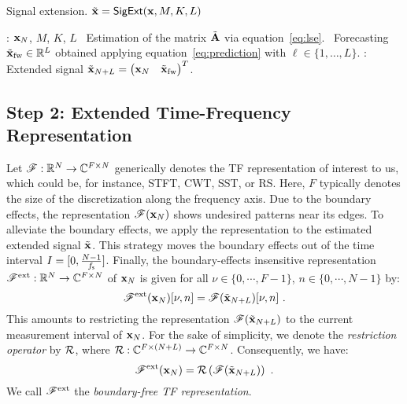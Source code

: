 \begin{algorithm}
\caption{Signal extension. $\tilde{{\mathbf x}} = \relax{\sf SigExt}({\mathbf x},M,K,L)$}
\label{alg:extension}
\begin{algorithmic}
: ${\mathbf x}_N$, $M$, $K$, $L$
\STATE \vspace{-2mm}
\STATE \quad\textbullet\ Estimation of the matrix $\tilde{{\mathbf A}}$ via equation~\eqref{eq:lse}.
\STATE \quad\textbullet\ Forecasting $\tilde{{\mathbf x}}_{\mathrm{fw}}\in{\mathbb R}^L$ obtained applying equation~\eqref{eq:prediction} with $\ell\in\{1,\ldots,L\}$.
\STATE \vspace{-2mm}
: Extended signal $\tilde{{\mathbf x}}_{N+L} = \begin{pmatrix} {\mathbf x}_N & \tilde{{\mathbf x}}_{\mathrm{fw}}\end{pmatrix}^T$. %
\end{algorithmic}
\end{algorithm}

\subsection{Step 2: Extended Time-Frequency Representation}
\label{sse:extension.TFR}
 
Let ${\mathscr F}:{\mathbb R}^{N}\to\mathbb C^{F\times N}$ generically denotes the TF representation of interest to us, which could be, for instance, STFT, CWT, SST, or RS. Here, $F$ typically denotes the size of the discretization along the frequency axis. Due to the boundary effects, the representation ${\mathscr F}({\mathbf x}_N)$ shows undesired patterns near its edges. To alleviate the boundary effects, we apply the representation to the estimated extended signal $\tilde{{\mathbf x}}$. This strategy moves the boundary effects out of the time interval $I=[0, \frac{N-1}{f_{\mathsf s}}]$. Finally, the boundary-effects insensitive representation ${\mathscr F}^{\mathrm{ext}}:{\mathbb R}^{N}\to\mathbb C^{F\times N}$ of ${\mathbf x}_N$ is given for all $\nu\in\{0,\cdots,F-1\}$, $n\in\{0,\cdots,N-1\}$ by:
\begin{equation}
\ccF^{\mathrm{ext}}(\bx_N)[\nu,n] = \ccF(\tilde \bx_{N+L})[\nu,n]\ .
\label{eq:restriction}
\end{equation}
This amounts to restricting the representation ${\mathscr F}(\tilde {{\mathbf x}}_{N+L})$ to the current measurement interval of ${\mathbf x}_N$. For the sake of simplicity, we denote the {\em restriction operator} by ${\mathcal R}$, where ${\mathcal R}:\mathbb C^{F\times (N+L)}\to\mathbb C^{F\times N}$. Consequently, we have:
\begin{equation}
\ccF^{\mathrm{ext}}(\bx_N) = \cR\left( \ccF(\tilde \bx_{N+L}) \right) \ .
\label{eq:bound.free.TFR}
\end{equation}
We call ${\mathscr F}^{\mathrm{ext}}$ the {\em boundary-free TF representation}.

